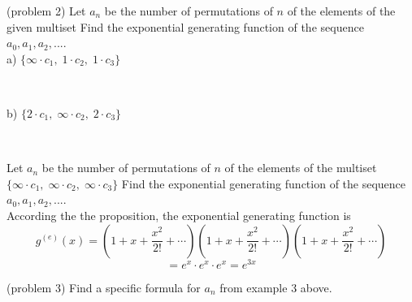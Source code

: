 \documentclass[handout]{ximera}
\begin{document}
\begin{problem}(problem 2)
Let $a_n$ be the number of permutations of $n$ of the elements of the given multiset 
Find the exponential generating function of the sequence $a_0, a_1, a_2, ...$.\\
a) $\{\infty  \cdot c_1, \;1 \cdot c_2,\; 1\cdot c_3\}$ 
\begin{multipleChoice}
\\
\end{multipleChoice}



b) $\{2 \cdot c_1,\; \infty \cdot c_2,\; 2 \cdot c_3\}$ 
\begin{multipleChoice}
\\
\end{multipleChoice}

\end{problem}




\begin{example}[example 3]
Let $a_n$ be the number of permutations of $n$ of the elements of the multiset $\{\infty \cdot c_1,\; \infty \cdot c_2, \;\infty \cdot c_3\}$
Find the exponential generating function of the sequence $a_0, a_1, a_2, ...$.\\
According the the proposition, the exponential generating function is
\[
g^{(e)}(x) = \left(1 + x + \frac{x^2}{2!} + \cdots \right)\left(1 + x + \frac{x^2}{2!} + \cdots \right)
\left(1 + x + \frac{x^2}{2!} + \cdots \right)
\]
\[
= e^x \cdot e^x \cdot e^x = e^{3x}
\]
\end{example}

\begin{problem}(problem 3)
Find a specific formula for $a_n$ from example 3 above.\\
\begin{multipleChoice}
\\
\\
\end{multipleChoice}
\end{problem}
\end{document}
